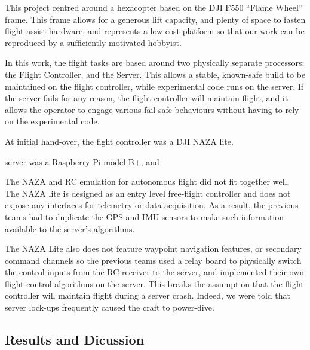 \documentclass{article}
\begin{document}
      This project centred around a hexacopter based on the DJI F550 ``Flame Wheel'' frame. This frame allows for a generous lift capacity, and plenty of space to fasten flight assist hardware, and represents a low cost platform so that our work can be reproduced by a sufficiently motivated hobbyist.

      In this work, the flight tasks are based around two physically separate processors; the Flight Controller, and the Server. This allows a stable, known-safe build to be maintained on the flight controller, while experimental code runs on the server. If the server fails for any reason, the flight controller will maintain flight, and it allows the operator to engage various fail-safe behaviours without having to rely on the experimental code.
      
      At initial hand-over, the fight controller was a DJI NAZA lite.
      
       server was a Raspberry Pi model B+, and

      The NAZA and RC emulation for autonomous flight did not fit together well. The NAZA lite is designed as an entry level free-flight controller and does not expose any interfaces for telemetry or data acquisition.  As a result, the previous teams had to duplicate the GPS and IMU sensors to make such information available to the server's algorithms.

      The NAZA Lite also does not feature waypoint navigation features, or secondary command channels so the previous teams used a relay board to physically switch the control inputs from the RC receiver to the server, and implemented their own flight control algorithms on the server.
      This breaks the assumption that the flight controller will maintain flight during a server crash.  Indeed, we were told that server lock-ups frequently caused the craft to power-dive.




    

      


  \subsection{Results and Dicussion}
\end{document}
